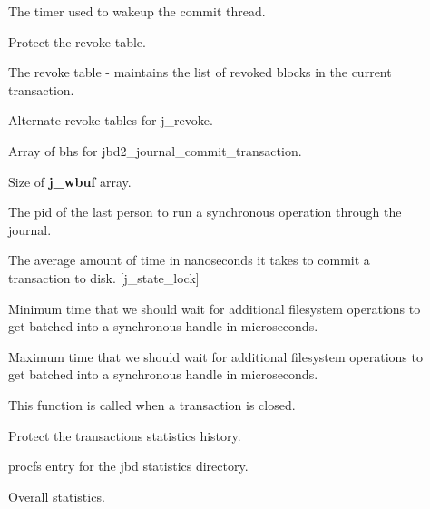 \documentclass[a4paper,8pt,english]{sphinxmanual}
\begin{document}
\begin{description}
\item[{}] \leavevmode
The timer used to wakeup the commit thread.

\item[{}] \leavevmode
Protect the revoke table.

\item[{}] \leavevmode
The revoke table - maintains the list of revoked blocks in the
current transaction.

\item[{}] \leavevmode
Alternate revoke tables for j\_revoke.

\item[{}] \leavevmode
Array of bhs for jbd2\_journal\_commit\_transaction.

\item[{}] \leavevmode
Size of \textbf{j\_wbuf} array.

\item[{}] \leavevmode
The pid of the last person to run a synchronous operation
through the journal.

\item[{}] \leavevmode
The average amount of time in nanoseconds it takes to commit a
transaction to disk. {[}j\_state\_lock{]}

\item[{}] \leavevmode
Minimum time that we should wait for additional filesystem operations
to get batched into a synchronous handle in microseconds.

\item[{}] \leavevmode
Maximum time that we should wait for additional filesystem operations
to get batched into a synchronous handle in microseconds.

\item[{}] \leavevmode
This function is called when a transaction is closed.

\item[{}] \leavevmode
Protect the transactions statistics history.

\item[{}] \leavevmode
procfs entry for the jbd statistics directory.

\item[{}] \leavevmode
Overall statistics.


\end{description}
\end{document}
